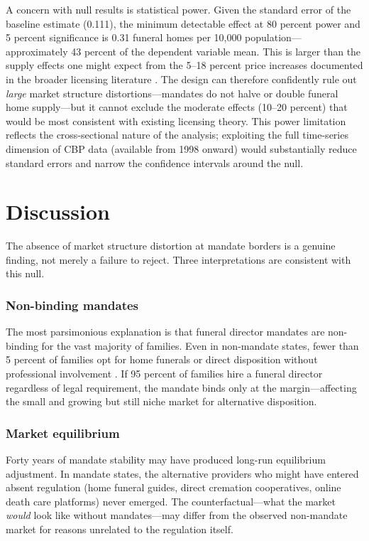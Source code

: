 \documentclass[12pt]{article}
\begin{document}
A concern with null results is statistical power. Given the standard error of the baseline estimate (0.111), the minimum detectable effect at 80 percent power and 5 percent significance is 0.31 funeral homes per 10,000 population---approximately 43 percent of the dependent variable mean. This is larger than the supply effects one might expect from the 5--18 percent price increases documented in the broader licensing literature \citep{kleiner2006licensing}. The design can therefore confidently rule out \textit{large} market structure distortions---mandates do not halve or double funeral home supply---but it cannot exclude the moderate effects (10--20 percent) that would be most consistent with existing licensing theory. This power limitation reflects the cross-sectional nature of the analysis; exploiting the full time-series dimension of CBP data (available from 1998 onward) would substantially reduce standard errors and narrow the confidence intervals around the null.


\section{Discussion}

The absence of market structure distortion at mandate borders is a genuine finding, not merely a failure to reject. Three interpretations are consistent with this null.

\subsubsection*{Non-binding mandates} The most parsimonious explanation is that funeral director mandates are non-binding for the vast majority of families. Even in non-mandate states, fewer than 5 percent of families opt for home funerals or direct disposition without professional involvement \citep{nfda2023statistics}. If 95 percent of families hire a funeral director regardless of legal requirement, the mandate binds only at the margin---affecting the small and growing but still niche market for alternative disposition.

\subsubsection*{Market equilibrium} Forty years of mandate stability may have produced long-run equilibrium adjustment. In mandate states, the alternative providers who might have entered absent regulation (home funeral guides, direct cremation cooperatives, online death care platforms) never emerged. The counterfactual---what the market \textit{would} look like without mandates---may differ from the observed non-mandate market for reasons unrelated to the regulation itself.
\end{document}
